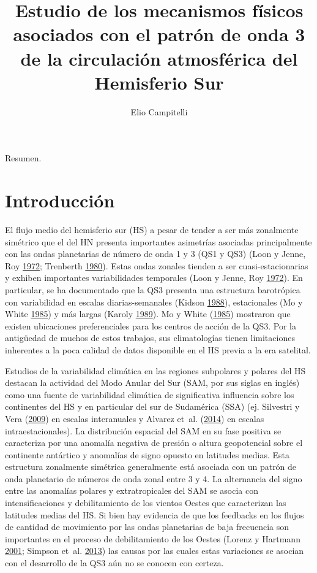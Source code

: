 \documentclass[spanish,a4paper,12p]{book}
\title{Estudio de los mecanismos físicos asociados con el patrón de onda 3 de
la circulación atmosférica del Hemisferio Sur}
\author{Elio Campitelli}
\date{}
\begin{document}
\maketitle

{
\setcounter{tocdepth}{3}
\tableofcontents
}
Resumen.


\listoffigures
\newpage

\chapter{Introducción}\label{introduccion}

El flujo medio del hemisferio sur (HS) a pesar de tender a ser más
zonalmente simétrico que el del HN presenta importantes asimetrías
asociadas principalmente con las ondas planetarias de número de onda 1 y
3 (QS1 y QS3) (Loon y Jenne, Roy \protect\hyperlink{ref-Loon1972}{1972};
Trenberth \protect\hyperlink{ref-Trenberth1980a}{1980}). Estas ondas
zonales tienden a ser cuasi-estacionarias y exhiben importantes
variabilidades temporales (Loon y Jenne, Roy
\protect\hyperlink{ref-Loon1972}{1972}). En particular, se ha
documentado que la QS3 presenta una estructura barotrópica con
variabilidad en escalas diarias-semanales (Kidson
\protect\hyperlink{ref-Kidson1988}{1988}), estacionales (Mo y White
\protect\hyperlink{ref-Mo1985}{1985}) y más largas (Karoly
\protect\hyperlink{ref-Karoly1989}{1989}). Mo y White
(\protect\hyperlink{ref-Mo1985}{1985}) mostraron que existen ubicaciones
preferenciales para los centros de acción de la QS3. Por la antigüedad
de muchos de estos trabajos, sus climatologías tienen limitaciones
inherentes a la poca calidad de datos disponible en el HS previa a la
era satelital.

Estudios de la variabilidad climática en las regiones subpolares y
polares del HS destacan la actividad del Modo Anular del Sur (SAM, por
sus siglas en inglés) como una fuente de variabilidad climática de
significativa influencia sobre los continentes del HS y en particular
del sur de Sudamérica (SSA) (ej. Silvestri y Vera
(\protect\hyperlink{ref-Silvestri2009}{2009}) en escalas interanuales y
Alvarez et~al. (\protect\hyperlink{ref-Alvarez2014}{2014}) en escalas
intraestacionales). La distribución espacial del SAM en su fase positiva
se caracteriza por una anomalía negativa de presión o altura
geopotencial sobre el continente antártico y anomalías de signo opuesto
en latitudes medias. Esta estructura zonalmente simétrica generalmente
está asociada con un patrón de onda planetario de números de onda zonal
entre 3 y 4. La alternancia del signo entre las anomalías polares y
extratropicales del SAM se asocia con intensificaciones y debilitamiento
de los vientos Oestes que caracterizan las latitudes medias del HS. Si
bien hay evidencia de que los feedbacks en los flujos de cantidad de
movimiento por las ondas planetarias de baja frecuencia son importantes
en el proceso de debilitamiento de los Oestes (Lorenz y Hartmann
\protect\hyperlink{ref-Lorenz2001}{2001}; Simpson et~al.
\protect\hyperlink{ref-Simpson2013}{2013}) las causas por las cuales
estas variaciones se asocian con el desarrollo de la QS3 aún no se
conocen con certeza.
\end{document}
